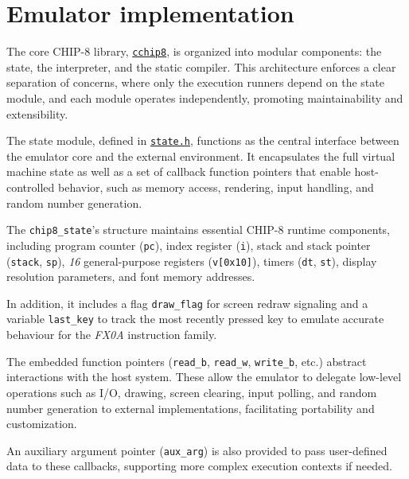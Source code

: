 \section{Emulator implementation}
\label{sec:ch3sec3}

\par The core CHIP-8 library, \href{https://github.com/solomonarul/cchip8}{\texttt{cchip8}}, is organized into modular components: the state, the interpreter, and the static compiler. This architecture enforces a clear separation of concerns, where only the execution runners depend on the state module, and each module operates independently, promoting maintainability and extensibility.

\par The state module, defined in \href{https://github.com/solomonarul/cchip8/blob/main/inc/cchip8/state.h}{\texttt{state.h}}, functions as the central interface between the emulator core and the external environment. It encapsulates the full virtual machine state as well as a set of callback function pointers that enable host-controlled behavior, such as memory access, rendering, input handling, and random number generation.

\par The \texttt{chip8\_state}'s structure maintains essential CHIP-8 runtime components, including program counter (\texttt{pc}), index register (\texttt{i}), stack and stack pointer (\texttt{stack}, \texttt{sp}), \textit{16} general-purpose registers (\texttt{v[0x10]}), timers (\texttt{dt}, \texttt{st}), display resolution parameters, and font memory addresses.

\par In addition, it includes a flag \texttt{draw\_flag} for screen redraw signaling and a variable \texttt{last\_key} to track the most recently pressed key to emulate accurate behaviour for the \textit{FX0A} instruction family.

\par The embedded function pointers (\texttt{read\_b}, \texttt{read\_w}, \texttt{write\_b}, etc.) abstract interactions with the host system. These allow the emulator to delegate low-level operations such as I/O, drawing, screen clearing, input polling, and random number generation to external implementations, facilitating portability and customization.

\par An auxiliary argument pointer (\texttt{aux\_arg}) is also provided to pass user-defined data to these callbacks, supporting more complex execution contexts if needed.

